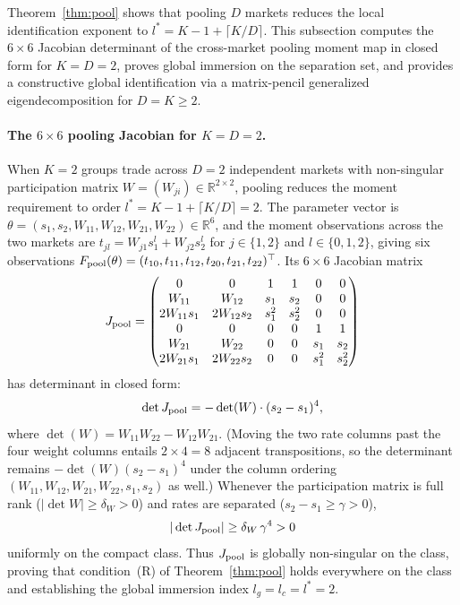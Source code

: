 Theorem~\ref{thm:pool} shows that pooling $D$ markets reduces the local identification exponent to $l^* = K - 1 + \lceil K/D \rceil$. This subsection computes the $6\times6$ Jacobian determinant of the cross-market pooling moment map in closed form for $K=D=2$, proves global immersion on the separation set, and provides a constructive global identification via a matrix-pencil generalized eigendecomposition for $D=K\ge2$.

\paragraph{The $6\times6$ pooling Jacobian for $K=D=2$.} When $K=2$ groups trade across $D=2$ independent markets with non-singular participation matrix $W=(W_{ji})\in\mathbb{R}^{2\times2}$, pooling reduces the moment requirement to order $l^*=K-1+\lceil K/D\rceil=2$. The parameter vector is $\theta=(s_1,s_2,W_{11},W_{12},W_{21},W_{22})\in\mathbb{R}^6$, and the moment observations across the two markets are $t_{jl}=W_{j1}s_1^l+W_{j2}s_2^l$ for $j\in\{1,2\}$ and $l\in\{0,1,2\}$, giving six observations $F_{\rm pool}(\theta)=(t_{10},t_{11},t_{12},t_{20},t_{21},t_{22})^\top$. Its $6\times6$ Jacobian matrix
\[
J_{\rm pool} = \begin{pmatrix}
0 & 0 & 1 & 1 & 0 & 0 \\
W_{11} & W_{12} & s_1 & s_2 & 0 & 0 \\
2W_{11}s_1 & 2W_{12}s_2 & s_1^2 & s_2^2 & 0 & 0 \\
0 & 0 & 0 & 0 & 1 & 1 \\
W_{21} & W_{22} & 0 & 0 & s_1 & s_2 \\
2W_{21}s_1 & 2W_{22}s_2 & 0 & 0 & s_1^2 & s_2^2
\end{pmatrix}
\]
has determinant in closed form:
\[
\det J_{\rm pool} = -\det(W)\cdot(s_2-s_1)^4,
\]
where $\det(W)=W_{11}W_{22}-W_{12}W_{21}$. (Moving the two rate columns past the four weight columns entails $2\times4=8$ adjacent transpositions, so the determinant remains $-\det(W)(s_2-s_1)^4$ under the column ordering $(W_{11},W_{12},W_{21},W_{22},s_1,s_2)$ as well.) Whenever the participation matrix is full rank ($|\det W|\ge\delta_W>0$) and rates are separated ($s_2-s_1\ge\gamma>0$),
\[
|\det J_{\rm pool}|\ge\delta_W\,\gamma^4>0
\]
uniformly on the compact class. Thus $J_{\rm pool}$ is globally non-singular on the class, proving that condition~(R) of Theorem~\ref{thm:pool} holds everywhere on the class and establishing the global immersion index $l_g=l_c=l^*=2$.

